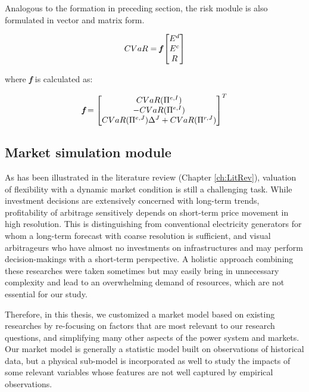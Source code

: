 Analogous to the formation in preceding section, the risk module is also formulated in vector and matrix form.

\begin{equation*}
CVaR= \textit{\textbf{f}}
\begin{bmatrix}
E^d \\ E^c \\ R
\end{bmatrix}
\end{equation*}

where \textit{\textbf{f}} is calculated as:

\begin{equation}
\textit{\textbf{f}} =
\begin{bmatrix}
CVaR(\Pi^{e,I})\\-CVaR(\Pi^{e,I})\\CVaR(\Pi^{e,J}) \Delta^J + CVaR(\Pi^{r,J})
\end{bmatrix}^T
\end{equation}

\subsection{Market simulation module}
\label{sec:market-simulation}
As has been illustrated in the literature review (Chapter \ref{ch:LitRev}), valuation of flexibility with a dynamic market condition is still a challenging task. While investment decisions are extensively concerned with long-term trends, profitability of arbitrage sensitively depends on short-term price movement in high resolution. This is distinguishing from conventional electricity generators for whom a long-term forecast with coarse resolution is sufficient, and visual arbitrageurs who have almost no investments on infrastructures and may perform decision-makings with a short-term perspective. A holistic approach combining these researches were taken sometimes \cite{Rastler2010}\cite{Eyer2010} but may easily bring in unnecessary complexity and lead to an overwhelming demand of resources, which are not essential for our study.

Therefore, in this thesis, we customized a market model based on existing researches by re-focusing on factors that are most relevant to our research questions, and simplifying many other aspects of the power system and markets. Our market model is generally a statistic model built on observations of historical data, but a physical sub-model is incorporated as well to study the impacts of some relevant variables whose features are not well captured by empirical observations.

